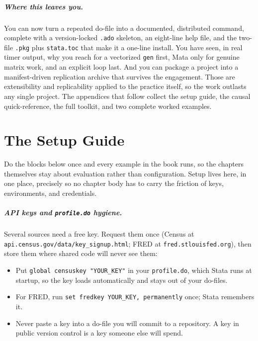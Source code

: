 \documentclass[
    a4paper,
    fontsize=10pt,
    twoside=true,
    numbers=noenddot,
]{kaobook}
\begin{document}
\paragraph{Where this leaves you.} You can now turn a repeated do-file into a documented, distributed command, complete with a version-locked \texttt{.ado} skeleton, an eight-line help file, and the two-file \texttt{.pkg} plus \texttt{stata.toc} that make it a one-line install. You have seen, in real timer output, why you reach for a vectorized \texttt{gen} first, Mata only for genuine matrix work, and an explicit loop last. And you can package a project into a manifest-driven replication archive that survives the engagement. Those are extensibility and replicability applied to the practice itself, so the work outlasts any single project. The appendices that follow collect the setup guide, the causal quick-reference, the full toolkit, and two complete worked examples.


\appendix
{}

\chapter{The Setup Guide}\label{app:setup}
Do the blocks below once and every example in the book runs, so the chapters themselves stay about evaluation rather than configuration. Setup lives here, in one place, precisely so no chapter body has to carry the friction of keys, environments, and credentials.

\paragraph{API keys and \texttt{profile.do} hygiene.} Several sources need a free key. Request them once (Census at \texttt{api.census.gov/data/key\_signup.html}; FRED at \texttt{fred.stlouisfed.org}), then store them where shared code will never see them:
\begin{itemize}
    \item Put \texttt{global censuskey "YOUR\_KEY"} in your \texttt{profile.do}, which Stata runs at startup, so the key loads automatically and stays out of your do-files.
    \item For FRED, run \texttt{set fredkey YOUR\_KEY, permanently} once; Stata remembers it.
    \item Never paste a key into a do-file you will commit to a repository. A key in public version control is a key someone else will spend.
\end{itemize}
\end{document}
